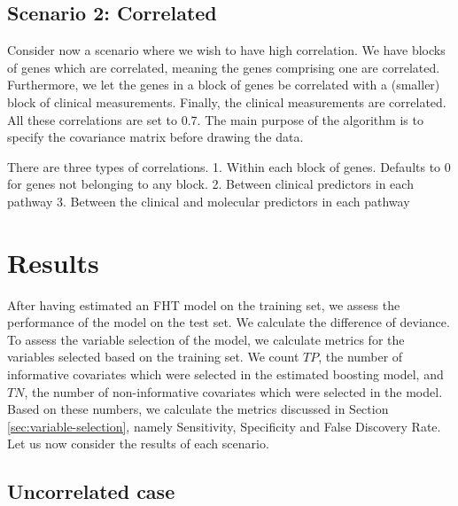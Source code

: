 \subsection{Scenario 2: Correlated}
Consider now a scenario where we wish to have high correlation.
We have blocks of genes which are correlated, meaning the genes comprising one are correlated.
Furthermore, we let the genes in a block of genes be correlated with a (smaller) block of clinical measurements.
Finally, the clinical measurements are correlated.
All these correlations are set to 0.7.
The main purpose of the algorithm is to specify the covariance matrix before drawing the data.

There are three types of correlations.
1. Within each block of genes. Defaults to 0 for genes not belonging to any block.
2. Between clinical predictors in each pathway
3. Between the clinical and molecular predictors in each pathway

\section{Results}
After having estimated an FHT model on the training set, we assess the performance of the model on the test set.
We calculate the difference of deviance.
To assess the variable selection of the model, we calculate metrics for the variables selected based on the training set.
We count $TP$, the number of informative covariates which were selected in the estimated boosting model, and $TN$, the number of non-informative covariates which were selected in the model.
Based on these numbers, we calculate the metrics discussed in Section \ref{sec:variable-selection}, namely Sensitivity, Specificity and False Discovery Rate.
Let us now consider the results of each scenario.

\subsection{Uncorrelated case}
